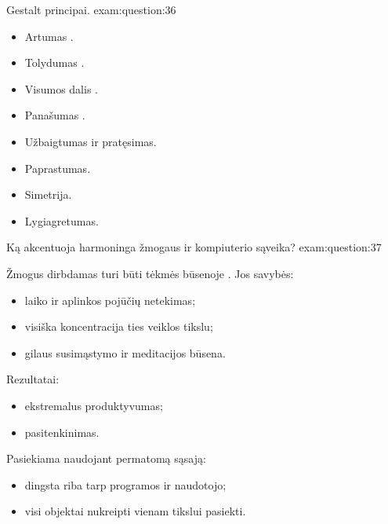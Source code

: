 \begin{question}{%
  Gestalt principai.
  }{exam:question:36}
  \begin{itemize}
    \item Artumas .
    \item Tolydumas .
    \item Visumos dalis .
    \item Panašumas .
    \item Užbaigtumas  ir pratęsimas.
    \item Paprastumas.
    \item Simetrija.
    \item Lygiagretumas.
  \end{itemize}
\end{question}

\begin{question}{%
  Ką akcentuoja harmoninga žmogaus ir kompiuterio sąveika?
  }{exam:question:37}
  
  Žmogus dirbdamas turi būti tėkmės būsenoje \cite[5]{skaidres-15}.
  Jos savybės:
  \begin{itemize}
    \item laiko ir aplinkos pojūčių netekimas;
    \item visiška koncentracija ties veiklos tikslu;
    \item gilaus susimąstymo ir meditacijos būsena.
  \end{itemize}
  Rezultatai:
  \begin{itemize}
    \item ekstremalus produktyvumas;
    \item pasitenkinimas.
  \end{itemize}
  Pasiekiama naudojant permatomą sąsają:
  \begin{itemize}
    \item dingsta riba tarp programos ir naudotojo;
    \item visi objektai nukreipti vienam tikslui pasiekti.
  \end{itemize}

\end{question}

